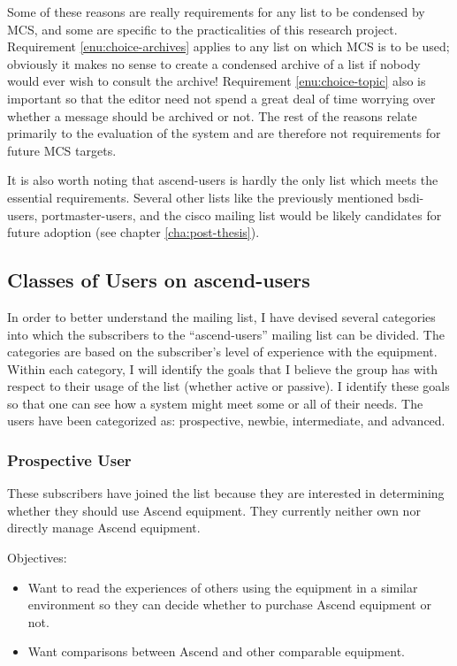 Some of these reasons are really requirements for any list to be condensed by
MCS, and some are specific to the practicalities of this research project.
Requirement \ref{enu:choice-archives} applies to any list on which MCS is to be
used; obviously it makes no sense to create a condensed archive of a list if
nobody would ever wish to consult the archive!  Requirement
\ref{enu:choice-topic} also is important so that the editor need not spend a
great deal of time worrying over whether a message should be archived or not.
The rest of the reasons relate primarily to the evaluation of the system and
are therefore not requirements for future MCS targets.

It is also worth noting that ascend-users is hardly the only list which meets
the essential requirements. Several other lists like the previously mentioned
bsdi-users, portmaster-users, and the cisco mailing list
\cite{nexial-mailinglists} would be likely candidates for future adoption (see
chapter \ref{cha:post-thesis}).

\subsection{Classes of Users on ascend-users}
In order to better understand the mailing list, I have devised several
categories into which the subscribers to the ``ascend-users'' mailing list can
be divided. The categories are based on the subscriber's level of experience
with the equipment. Within each category, I will identify the goals that I
believe the group has with respect to their usage of the list (whether active
or passive).  I identify these goals so that one can see how a system might
meet some or all of their needs. The users have been categorized as:
prospective, newbie, intermediate, and advanced.

\subsubsection{Prospective User}
These subscribers have joined the list because they are interested in
determining whether they should use Ascend equipment. They currently neither
own nor directly manage Ascend equipment.

Objectives:
\begin{itemize}
\item Want to read the experiences of others using the equipment in a similar
  environment so they can decide whether to purchase Ascend equipment or not.
\item Want comparisons between Ascend and other comparable equipment.
\end{itemize}

